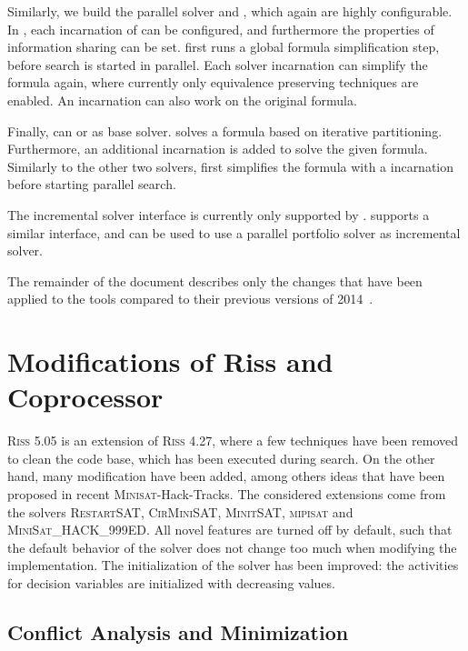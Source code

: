 \documentclass[conference]{IEEEtran}
\begin{document}
Similarly, we build the parallel solver \priss and \pcasso, which again are highly configurable. 
In \priss, each incarnation of \riss can be configured, and furthermore the properties of information sharing can be set. 
\priss first runs a global formula simplification step, before search is started in parallel. 
Each solver incarnation can simplify the formula again, where currently only equivalence preserving techniques are enabled. 
An incarnation can also work on the original formula. 

Finally, \pcasso can \riss or \priss as base solver. 
\pcasso solves a formula based on iterative partitioning. 
Furthermore, an additional \priss incarnation is added to solve the given formula. 
Similarly to the other two solvers, \pcasso first simplifies the formula with a \coprocessor incarnation before starting parallel search.

The incremental solver interface is currently only supported by \riss. 
\priss supports a similar interface, and can be used to use a parallel portfolio solver as incremental solver. 

The remainder of the document describes only the changes that have been applied to the tools compared to their previous versions of 2014~\cite{Mriss427-2014,MRissBlackbox-2014,pcasso2014}.

\section{Modifications of Riss and Coprocessor}

\textsc{Riss 5.05} is an extension of \textsc{Riss 4.27}, where a few techniques have been removed to clean the code base, which has been executed during search. 
On the other hand, many modification have been added, among others ideas that have been proposed in recent \textsc{Minisat}-Hack-Tracks. 
The considered extensions come from the solvers \textsc{RestartSAT}, \textsc{CirMiniSAT}, \textsc{MinitSAT}, \textsc{mipisat} and \textsc{MiniSat\_HACK\_999ED}. 
All novel features are turned off by default, such that the default behavior of the solver does not change too much when modifying the implementation. 
The initialization of the solver has been improved: the activities for decision variables are initialized with decreasing values. 

\subsection{Conflict Analysis and Minimization}
\end{document}
